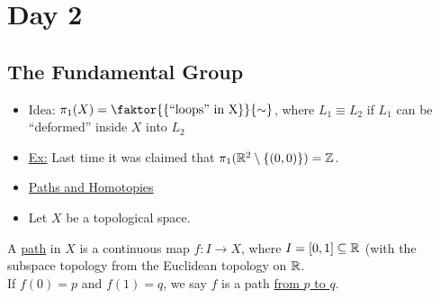 \section{Day 2}
\subsection{The Fundamental Group}
    \begin{itemize}
        \item Idea: $\pi_1(X)=\faktor{\{\text{``loops'' in X}\}}{\sim}$, where $L_1 \equiv L_2$ if $L_1$ can be ``deformed'' inside $X$
            into $L_2$
        \item \underline{Ex:} Last time it was claimed that $\pi_1(\mathbb{R}^2\setminus \{(0,0)\})=\mathbb{Z}$.
        \item\underline{Paths and Homotopies}
        \item Let $X$ be a topological space.
    \end{itemize}
        \begin{definition}
            A \underline{path} in $X$ is a continuous map $f:I \rightarrow X$, where $I=[0,1]\subseteq \mathbb{R}$ (with the
            subspace topology from the Euclidean topology on $\mathbb{R}$.\\
            If $f(0)=p$ and $f(1)=q$, we say $f$ is a path \underline{from $p$ to $q$}.
        \end{definition}

